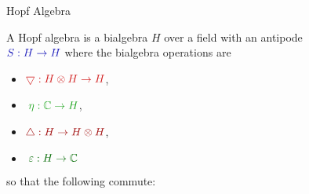 \documentclass{beamer}
\begin{document}
\begin{frame}[fragile]{Hopf Algebra}

A Hopf algebra is a bialgebra $H$ over a field with an antipode \\\;\;\;\;\;\;\;\;$\color{darkblue}S:H\to H$ \;\;\;where the bialgebra operations are 
\vspace{-2ex}
\begin{multicols}{2}
\begin{itemize}
\item[]<2->$\color{lightred}\bigtriangledown:H\otimes H\to H$, 
\item[]<3->$\color{lightgreen}\;\eta:\mathbb{C}\to H$, 
\item[]<4->$\color{darkred}\triangle:H\to H\otimes H$, 
\item[]<5->$\color{darkgreen}\;\varepsilon:H\to\mathbb{C}$
\end{itemize}
\end{multicols}
\vspace{-2ex}
\pause so that the following commute:


\end{frame}
\end{document}
